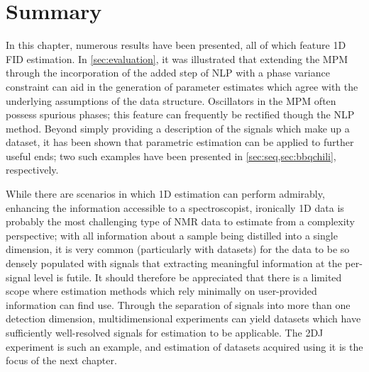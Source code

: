 \section{Summary}

In this chapter, numerous results have been presented, all of which feature
\ac{1D} \ac{FID} estimation.
In \cref{sec:evaluation}, it was illustrated that extending the \ac{MPM} through the
incorporation of the added step of \ac{NLP} with a phase variance constraint can
aid in the generation of parameter estimates which agree with the underlying
assumptions of the data structure. Oscillators in the \ac{MPM} often possess
spurious phases; this feature can frequently be rectified though the \ac{NLP}
method. Beyond simply providing a description of the signals which make up
a dataset, it has been shown that parametric estimation can be applied to
further useful ends; two such examples have been presented in
\cref{sec:seq,sec:bbqchili}, respectively.

While there are scenarios in which \ac{1D} estimation can perform admirably,
enhancing the information accessible to a spectroscopist, ironically \ac{1D}
data is probably the most challenging type of \ac{NMR} data to estimate from a
complexity perspective; with all information about a sample being
distilled into a single dimension, it is very common (particularly with
 datasets) for the data to be so densely
populated with signals that extracting meaningful information at
the per-signal level is futile. It should therefore be appreciated that
there is a limited scope where estimation methods which rely minimally on
user-provided information can find use. Through the separation of signals into
more than one detection dimension, multidimensional experiments can yield
datasets which have sufficiently well-resolved signals for estimation to be
applicable. The \ac{2DJ} experiment is such an example, and estimation of
datasets acquired using it is the focus of the next chapter.
